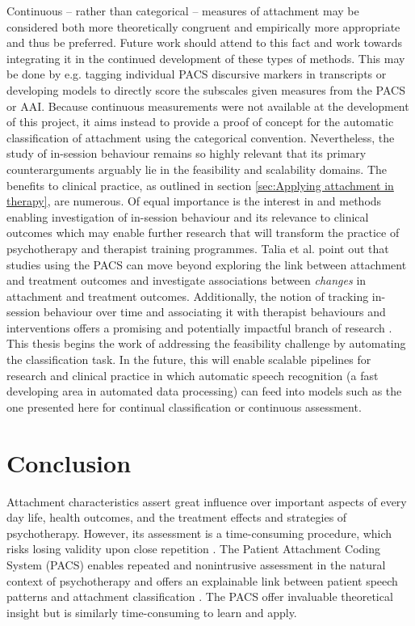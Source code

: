 \documentclass[12pt]{report}
\begin{document}
Continuous -- rather than categorical -- measures of attachment may be considered both more theoretically congruent and empirically more appropriate and thus be preferred.
Future work should attend to this fact and work towards integrating it in the continued development of these types of methods.
This may be done by e.g. tagging individual PACS discursive markers in transcripts or developing models to directly score the subscales given measures from the PACS or AAI.
Because continuous measurements were not available at the development of this project, it aims instead to provide a proof of concept for the automatic classification of attachment using the categorical convention.
Nevertheless, the study of in-session behaviour remains so highly relevant that its primary counterarguments arguably lie in the feasibility and scalability domains.
The benefits to clinical practice, as outlined in section \ref{sec:Applying attachment in therapy}, are numerous.
Of equal importance is the interest in and methods enabling investigation of in-session behaviour and its relevance to clinical outcomes which may enable further research that will transform the practice of psychotherapy and therapist training programmes.
Talia et al. \citeyear{Talia2017} point out that studies using the PACS can move beyond exploring the link between attachment and treatment outcomes and investigate associations between \textit{changes} in attachment and treatment outcomes.
Additionally, the notion of tracking in-session behaviour over time and associating it with therapist behaviours and interventions offers a promising and potentially impactful branch of research \cite{Slade2016, Talia2017}.
This thesis begins the work of addressing the feasibility challenge by automating the classification task.
In the future, this will enable scalable pipelines for research and clinical practice in which automatic speech recognition (a fast developing area in automated data processing) can feed into models such as the one presented here for continual classification or continuous assessment.

\section{Conclusion}
Attachment characteristics assert great influence over important aspects of every day life, health outcomes, and the treatment effects and strategies of psychotherapy.
However, its assessment is a time-consuming procedure, which risks losing validity upon close repetition \cite{Daniel2015,Hesse1999}.
The Patient Attachment Coding System (PACS) enables repeated and nonintrusive assessment in the natural context of psychotherapy and offers an explainable link between patient speech patterns and attachment classification \cite{Talia2017,Talia2014}.
The PACS offer invaluable theoretical insight but is similarly time-consuming to learn and apply.
\end{document}
